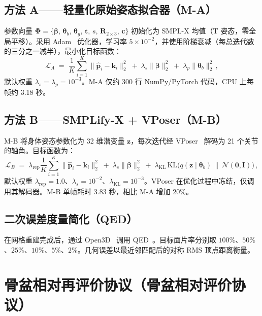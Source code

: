 \documentclass[a4paper,11pt]{article}
\newcommand{\prp}{骨盆相对评价协议}
\begin{document}
\subsection{方法 A——轻量化原始姿态拟合器（M-A）}
参数向量 $\boldsymbol{\Phi} = \{\boldsymbol{\beta},\,\boldsymbol{\theta}_b,\,\boldsymbol{\theta}_g,\,\mathbf{t},\,s,\,\mathbf{R}_{2\times 3},\,\mathbf{c}\}$ 初始化为 SMPL-X 均值（T 姿态，零全局平移）。采用 Adam~\cite{Adam} 优化器，学习率 $5\!\times\!10^{-2}$，并使用阶梯衰减（每总迭代数的三分之一减半），最小化目标函数：
\begin{equation}
\mathcal{L}_A \;=\; \frac{1}{K}\sum_{i=1}^{K}\|\hat{\mathbf{p}}_i - \mathbf{k}_i\|_2^2 \;+\; \lambda_s\|\boldsymbol{\beta}\|_2^2 \;+\; \lambda_p\|\boldsymbol{\theta}_b\|_2^2\,,
\end{equation}
默认权重 $\lambda_s=\lambda_p=10^{-3}$。M-A 仅约 300 行 NumPy/PyTorch 代码，CPU 上每帧约 3.18 秒。

\subsection{方法 B——SMPLify-X + VPoser（M-B）}
M-B 将身体姿态参数化为 32 维潜变量 $\mathbf{z}$，每次迭代经 VPoser~\cite{VPoser} 解码为 21 个关节的轴角。目标函数为：
\begin{equation}
\mathcal{L}_B \;=\; \lambda_{\text{rep}}\frac{1}{K}\sum_{i=1}^{K}\|\hat{\mathbf{p}}_i - \mathbf{k}_i\|_2^2 \;+\; \lambda_s\|\boldsymbol{\beta}\|_2^2 \;+\; \lambda_{\text{KL}}\,\mathrm{KL}\!\big(q(\mathbf{z}\mid\boldsymbol{\theta}_b)\,\|\,\mathcal{N}(\mathbf{0},\mathbf{I})\big)\,,
\end{equation}
默认权重 $\lambda_{\text{rep}}=1.0$、$\lambda_s=10^{-2}$、$\lambda_{\text{KL}}=10^{-3}$。VPoser 在优化过程中冻结，仅调用其解码器。M-B 单帧耗时 3.83 秒，相比 M-A 增加 20\%。

\subsection{二次误差度量简化（QED）}
在网格重建完成后，通过 Open3D~\cite{Open3D} 调用 QED~\cite{QED}。目标面片率分别取 $100\%$、$50\%$、$25\%$、$10\%$、$5\%$、$2\%$。几何误差以最近邻匹配后的对称 RMS 顶点距离衡量。

\section{骨盆相对再评价协议（\prp）}
\label{sec:protocol}
\end{document}
